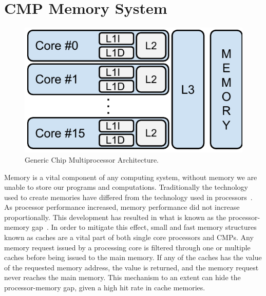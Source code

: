 \section{CMP Memory System}

\begin{figure}[ht]
\centering
\includegraphics[scale=.65]{figures/processor_model/processor_model}
\caption{Generic Chip Multiprocessor Architecture.}
\label{fig:cmp_model}
\end{figure}

Memory is a vital component of any computing system, without memory we are unable to store our programs and computations.
Traditionally the technology used to create memories have differed from the technology used in processors~\cite{Wilkes2001}.
As processor performance increased, memory performance did not increase proportionally.
This development has resulted in what is known as the processor-memory gap~\cite{Wilkes2001}.
In order to mitigate this effect, small and fast memory structures known as caches are a vital part of both single core processors and CMPs.
Any memory request issued by a processing core is filtered through one or multiple caches before being issued to the main memory.
If any of the caches has the value of the requested memory address, the value is returned, and the memory request never reaches the main memory.
This mechanism to an extent can hide the processor-memory gap, given a high hit rate in cache memories.

